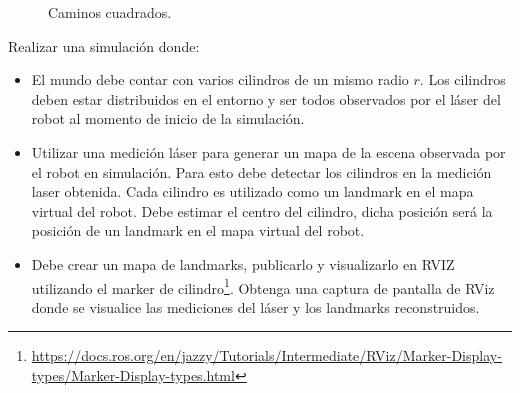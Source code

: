 \documentclass[tp]{lcc}
\begin{document}
\begin{figure}[!htbp]
    \centering
    \hspace{3cm}
    \caption{Caminos cuadrados.}
    \label{fig:trajectories}
\end{figure}

\ejercicio Realizar una simulación donde:
\begin{itemize}
    \item El mundo debe contar con varios cilindros de un mismo radio $r$. Los cilindros deben estar distribuidos en el entorno y ser todos observados por el láser del robot al momento de inicio de la simulación.
    \item Utilizar una medición láser para generar un mapa de la escena observada por el robot en simulación. Para esto debe detectar los cilindros en la medición laser obtenida. Cada cilindro es utilizado como un landmark en el mapa virtual del robot. Debe estimar el centro del cilindro, dicha posición será la posición de un landmark en el mapa virtual del robot.
    \item Debe crear un mapa de landmarks, publicarlo y visualizarlo en RVIZ utilizando el marker de cilindro\footnote{\url{https://docs.ros.org/en/jazzy/Tutorials/Intermediate/RViz/Marker-Display-types/Marker-Display-types.html}}. Obtenga una captura de pantalla de RViz donde se visualice las mediciones del láser y los landmarks reconstruidos.
\end{itemize}





\printbibliography
\end{document}
